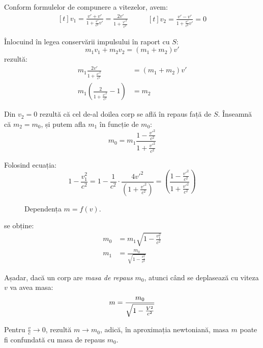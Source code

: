 Conform formulelor de compunere a vitezelor, avem:
\begin{equation*}
    \begin{aligned}[t]
        v_1 = \frac{v' + v'}{1 + \frac{v'}{c^2}v'} = \frac{2v'}{1 + \frac{v'^2}{c^2}}
    \end{aligned}
    \qquad
    \begin{aligned}[t]
        v_2 = \frac{v' - v'}{1 + \frac{v'}{c^2}v'} = 0
    \end{aligned}
\end{equation*}

\clearpage

Înlocuind în legea conservării impulsului în raport cu $S$:
\[ m_1 v_1 + m_2 v_2 = (m_1 + m_2) v' \]
rezultă:
\[
    \begin{aligned}
        m_1 \frac{2v'}{1 + \frac{v'^2}{c^2}} &= \left( m_1 + m_2 \right)v' \\
        m_1 \left( \frac{2}{1 + \frac{v'^2}{c^2}} - 1 \right) &= m_2
    \end{aligned}
\]

Din \( v_2 = 0 \) rezultă că cel de-al doilea corp se află în repaus față de $S$.
Înseamnă că \( m_2 = m_0 \), și putem afla $m_1$ în funcție de $m_0$:
\[ m_0 = m_1 \frac{1 - \frac{v'^2}{c^2}}{1 + \frac{v'^2}{c^2}} \]

Folosind ecuația:
\[
    1 - \frac{v_1^2}{c^2}
    = 1 - \frac{1}{c^2}\cdot\frac{4v'^2}{\left(1 + \frac{v'^2}{c^2}\right)}
    = \left(\frac{1 - \frac{v'^2}{c^2}}{1 + \frac{v'^2}{c^2}}\right)
\]

\begin{figure}
    \caption{Dependența $m = f(v)$.}
\end{figure}

se obține:
\[
    \begin{aligned}
        m_0 &= m_1\sqrt{1 - \frac{v_1^2}{c^2}} \\
        m_1 &= \frac{m_0}{\sqrt{1 - \frac{v_1^2}{c^2}}}
    \end{aligned}
\]

Așadar, dacă un corp are \emph{masa de repaus} $m_0$, atunci când se deplasează cu
viteza $v$ va avea masa:
{
    \color{\accentcolor}
    \[ m = \frac{m_0}{\sqrt{1 - \frac{V^2}{c^2}}} \]
}

Pentru \( \frac{v}{c} \rightarrow 0 \), rezultă \( m \rightarrow m_0 \), adică, în
aproximația newtoniană, masa $m$ poate fi confundată cu masa de repaus $m_0$.
